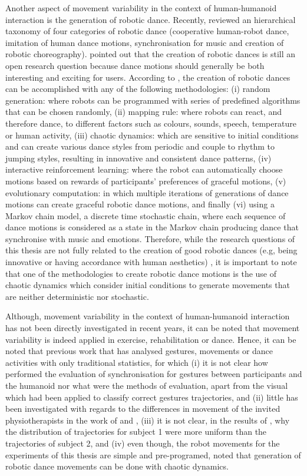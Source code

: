 Another aspect of movement variability in the context of human-humanoid 
interaction is the generation of robotic dance.
Recently, \cite{peng2015} reviewed an hierarchical taxonomy of 
four categories of robotic dance (cooperative human-robot dance, 
imitation of human dance motions, synchronisation for music and 
creation of robotic choreography).
\cite{peng2015} pointed out that the creation of robotic dances is still 
an open research question because dance motions should generally be both 
interesting and exciting for users. 
According to \cite{peng2015}, the creation of robotic dances can be 
accomplished with any of the following methodologies:
(i) random generation: where robots can be 
programmed with series of predefined algorithms that can be chosen randomly,
(ii) mapping rule:  where robots can react, and therefore dance, to different 
factors such as colours, sounds, speech, temperature or human activity,
(iii) chaotic dynamics: which are sensitive to initial conditions and 
can create various dance styles from periodic and couple to rhythm to 
jumping styles, resulting in innovative and consistent dance patterns,
(iv) interactive reinforcement learning: where the robot can automatically 
choose motions based on rewards of participants' 
preferences of graceful motions,
(v) evolutionary computation: in which multiple iterations of generations
of dance motions can create graceful robotic dance motions, and
finally (vi) using a Markov chain model, a discrete time stochastic chain, 
where each sequence of dance motions is considered as a state in the Markov 
chain producing dance that synchronise with music and emotions.
Therefore, while the research questions of this thesis are not fully related 
to the creation of good robotic dances (e.g, being innovative or having 
accordance with human aesthetics) \citep{peng2015}, it is important to note 
that one of the methodologies to create robotic dance motions is the use of 
chaotic dynamics
which consider initial conditions to generate movements 
that are neither deterministic nor stochastic.

Although, movement variability in the context of human-humanoid interaction
has not been directly investigated in recent years, it can be noted 
that movement variability is indeed applied in exercise, 
rehabilitation or dance.
Hence, it can be noted that previous work that has analysed gestures, 
movements or dance activities with only traditional statistics, for which
(i) it is not clear how \cite{gorer2013} performed the evaluation of 
synchronisation for gestures between participants and the humanoid
nor what were the methods of evaluation, apart from the visual 
which had been applied to classify correct gestures trajectories,
 and (ii) little has been investigated with regards to the 
differences in movement of the invited physiotherapists in the work of
\cite{guneysu2014} and  \cite{guneysu2015},
(iii) it is not clear, in the results of \cite{tsuchida2013}, 
why the distribution of trajectories for subject 1 
were more uniform than the trajectories of subject 2, and
(iv) even though, the robot movements for the experiments of this thesis 
are simple and pre-programed, \cite{peng2015} noted that generation of 
robotic dance movements can be done with chaotic dynamics.

